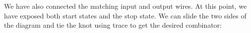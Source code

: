 \documentclass{llncs}
\begin{document}
%



\begin{center}
\end{center}

We have also connected the matching input and output wires. At this point, we
have exposed both start states and the stop state. 
We can slide the two sides of the diagram and tie the knot using {{trace}} to
get the desired combinator:
\end{document}
